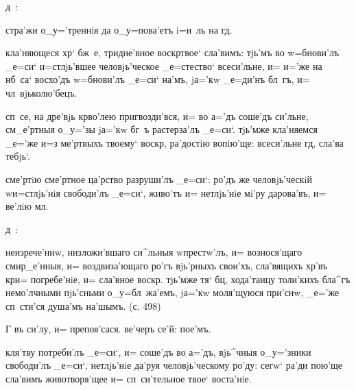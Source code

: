 
д~:%

стра'жи о_у='треннiя да о_у=пова'етъ i=и~ль на гд.

кла'няющеся хр` бж~е, тридне'вное воскр твое` 
сла'вимъ: тjь'мъ во w=бнови'лъ _е=си` и=стлjь'вшее 
человjь'ческое _е=стество` всеси'льне, и= и='же на нб~са` 
восхо'дъ w=бнови'лъ _е=си` на'мъ, jа='кw _е=ди'нъ бл~гъ, 
и= чл~вjьколю'бецъ. %

сп~се, на дре'вjь кр во'лею пригвозди'вся, и= во 
а='дъ соше'дъ си'льне, см_е'ртныя о_у='зы jа='кw бг~ъ 
растерза'лъ _е=си`. тjь'мже кла'няемся _е='же и=з\ъ 
ме'ртвыхъ твоему` воскр, ра'достiю вопiю'ще: 
всеси'льне гд, сла'ва тебjь`.

сме'ртiю сме'ртное ца'рство разруши'лъ _е=си`: ро'дъ же 
человjь'ческiй w\т и=стлjь'нiя свободи'лъ _е=си`, живо'тъ 
и= нетлjь'нiе мi'ру дарова'въ, и= ве'лiю мл.

д~:%

неизрече'ннw, низложи'вшаго си^льныя w\т престw'лъ, и= 
вознося'щаго смир_е'нныя, и= воздвиза'ющаго ро'гъ 
вjь'рныхъ свои'хъ, сла'вящихъ хр'въ кр и= 
погребе'нiе, и= сла'вное воскр. тjь'мже тя` бц, 
хода'таицу толи'кихъ бла^гъ немо'лчными пjь'сньми 
о_у=бл~жа'емъ, jа='кw моля'щуюся при'снw, _е='же 
сп~сти'ся душа'мъ на'шымъ. (с. 498)

Г%
въ си'лу, и= препоя'сася. %
ве'черъ се'й: %
пое'мъ.%


кля'тву потреби'лъ _е=си`, и= соше'дъ во а='дъ, вjь^чныя 
о_у='зники свободи'лъ _е=си`, нетлjь'нiе да'руя 
человjь'ческому ро'ду: сегw` ра'ди пою'ще сла'вимъ 
животворя'щее и= сп~си'тельное твое` воста'нiе.


